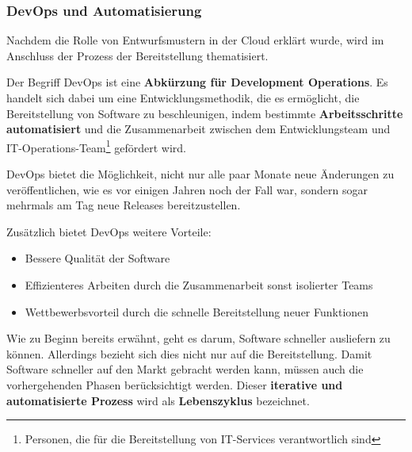     



    \subsubsection{DevOps und Automatisierung} \label{DevOps}

    Nachdem die Rolle von Entwurfsmustern in der Cloud erklärt wurde, wird im Anschluss der Prozess der Bereitstellung thematisiert.
    
    Der Begriff DevOps ist eine \textbf{Abkürzung für Development Operations}. Es handelt sich dabei um eine Entwicklungsmethodik, die es ermöglicht, die Bereitstellung von Software zu beschleunigen, indem bestimmte \textbf{Arbeitsschritte automatisiert} und die Zusammenarbeit zwischen dem Entwicklungsteam und IT-Operations-Team\footnote{Personen, die für die Bereitstellung von IT-Services verantwortlich sind} gefördert wird.
    \cite{EA:Web35}

    DevOps bietet die Möglichkeit, nicht nur alle paar Monate neue Änderungen zu veröffentlichen, wie es vor einigen Jahren noch der Fall war, sondern sogar mehrmals am Tag neue Releases bereitzustellen. 
    \cite{EA:Web36}
    
    Zusätzlich bietet DevOps weitere Vorteile:
    \begin{itemize}
        \item Bessere Qualität der Software
        \item Effizienteres Arbeiten durch die Zusammenarbeit sonst isolierter Teams
        \item Wettbewerbsvorteil durch die schnelle Bereitstellung neuer Funktionen
    \end{itemize}

    Wie zu Beginn bereits erwähnt, geht es darum, Software schneller ausliefern zu können. Allerdings bezieht sich dies nicht nur auf die Bereitstellung. 
    Damit Software schneller auf den Markt gebracht werden kann, müssen auch die vorhergehenden Phasen berücksichtigt werden.
    Dieser \textbf{iterative und automatisierte Prozess} wird als \textbf{Lebenszyklus} bezeichnet.
    \cite{EA:Web35}

